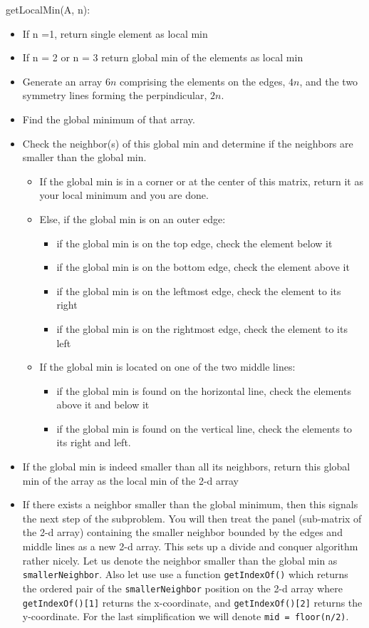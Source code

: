 \documentclass[11pt, oneside]{article}   	%
\theoremstyle{definition}
\theoremstyle{remark}
\begin{document}
\begin{enumerate}
      getLocalMin(A, n):
   \begin{itemize}
   \item If n =1, return single element as local min
   \item If n = 2 or n = 3 return global min of the elements as local min
   \item Generate an array $6n$ comprising the elements on the edges, $4n$, and the two symmetry lines forming the perpindicular, $2n$.
   \item Find the global minimum of that array.
   \item Check the neighbor(s) of this global min and determine if the neighbors are smaller than the global min. 
   \begin{itemize}
   \item If the global min is in a corner or at the center of this matrix, return it as your local minimum and you are done.
   \item Else, if the global min is on an outer edge:
   \begin{itemize}
   \item if the global min is on the top edge, check the element below it
   \item if the global min is on the bottom edge, check the element above it
   \item if the global min is on the leftmost edge, check the element to its right
   \item if the global min is on the rightmost edge, check the element to its left
   \end{itemize}
   \item If the global min is located on one of the two middle lines:
   \begin{itemize}
   \item if the global min is found on the horizontal line, check the elements above it and below it
   \item if the global min is found on the vertical line, check the elements to its right and left.
   \end{itemize}
   \end{itemize}
   \item If the global min is indeed smaller than all its neighbors, return this global min of the array as the local min of the 2-d array
   \item If there exists a neighbor smaller than the global minimum, then this signals the next step of the subproblem. You will then treat the panel (sub-matrix of the 2-d array) containing the smaller neighbor bounded by the edges and middle lines as a new 2-d array. This sets up a divide and conquer algorithm rather nicely. Let us denote the neighbor smaller than the global min as \texttt{smallerNeighbor}.  Also let use use a function \texttt{getIndexOf()} which returns the ordered pair of the \texttt{smallerNeighbor} position on the 2-d array where \texttt{getIndexOf()[1]} returns the x-coordinate, and \texttt{getIndexOf()[2]} returns the y-coordinate. For the last simplification we will denote \texttt{mid = floor(n/2)}. 

\end{itemize}
\end{enumerate}
\end{document}
